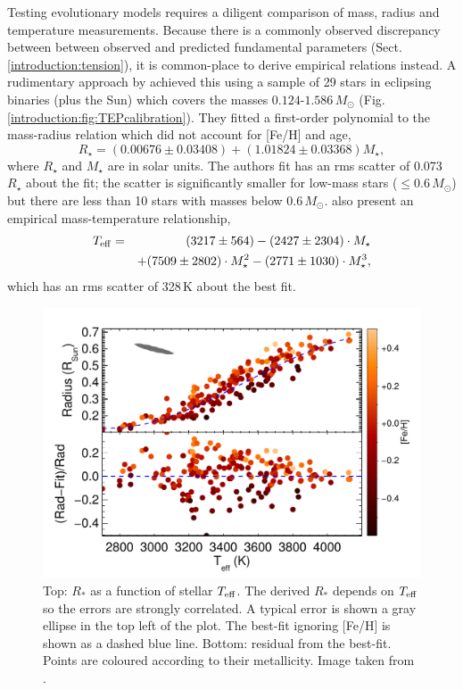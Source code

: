 Testing evolutionary models requires a diligent comparison of mass, radius and temperature measurements. Because there is a commonly observed discrepancy between between observed and predicted fundamental parameters (Sect. \ref{introduction:tension}), it is common-place to derive empirical relations instead. A rudimentary approach by \citet{2009MNRAS.394..272S} achieved this using a sample of 29 stars in eclipsing binaries (plus the Sun) which covers the masses $0.124$-$1.586\,M_\odot$  (Fig. \ref{introduction:fig:TEPcalibration}). They fitted a first-order polynomial to the mass-radius relation which did not account for [Fe/H] and age,
%
\begin{equation}
    R_\star = (0.00676 \pm 0.03408) + (1.01824 \pm 0.03368) M_\star,
\end{equation}
%
where $R_\star$ and $M_\star$ are in solar units. The authors fit has an rms scatter of 0.073\,$R_\star$ about the fit; the scatter is significantly smaller for low-mass stars ($\leq 0.6\,M_\odot$) but there are less than 10 stars with masses below 0.6\,$M_\odot$. \citet{2009MNRAS.394..272S} also present an empirical mass-temperature relationship,
%
\begin{eqnarray}
T_{\rm eff} & = & (3217 \pm 564) - (2427 \pm 2304) \cdot M_\star \nonumber\\
      &   & + (7509 \pm 2802) \cdot M_\star^2 - (2771 \pm 1030) \cdot M_\star^3,
\end{eqnarray}
%
which has an rms scatter of 328\,K about the best fit. 


\begin{figure}
    \centering
    \includegraphics[width=\textwidth]{3-images/f9.pdf}
    \caption{Top: $R_*$ as a function of stellar $T_{\rm eff}$. The derived $R_*$ depends on $T_{\rm eff}$ so the errors are strongly correlated. A typical error is shown a gray ellipse in the top left of the plot. The best-fit ignoring [Fe/H] is shown as a dashed blue line. Bottom: residual from the best-fit. Points are coloured according to their metallicity. Image taken from \protect\citet{2015ApJ...804...64M}.}
    \label{intro:fig:Mann3}
\end{figure}


